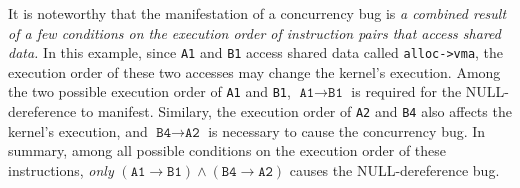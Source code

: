 It is noteworthy that the manifestation of a concurrency bug is
\textit{a combined result of a few conditions on the execution order
  of instruction pairs that access shared data.}
%
In this example, since \texttt{A1} and \texttt{B1} access shared data
called \texttt{alloc->vma}, the execution order of these two accesses
may change the kernel's execution. Among the two possible execution
order of \texttt{A1} and \texttt{B1},
$\texttt{A1} \rightarrow \texttt{B1}$ is required for the
NULL-dereference to manifest.
%
Similary, the execution order of \texttt{A2} and \texttt{B4} also
affects the kernel's execution, and
$\texttt{B4} \rightarrow \texttt{A2}$ is necessary to cause the
concurrency bug.
%
In summary, among all possible conditions on the execution order of
these instructions, \textit{only}
$(\texttt{A1} \rightarrow \texttt{B1}) \wedge (\texttt{B4} \rightarrow
\texttt{A2})$ causes the NULL-dereference bug.








